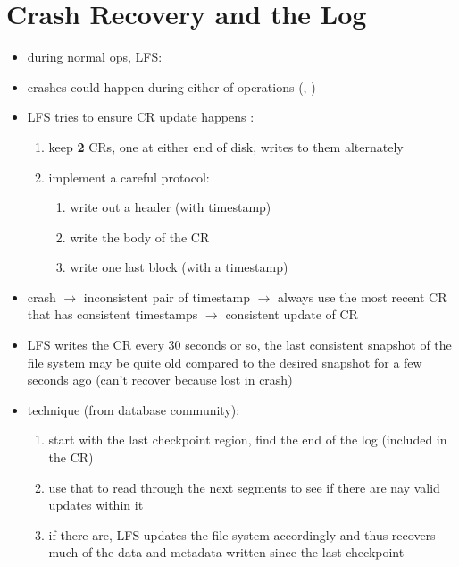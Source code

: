 \section*{Crash Recovery and the Log}
\begin{itemize}
\item during normal ops, LFS:
\item crashes could happen during either of operations (, )
\item LFS tries to ensure CR update happens :
  \begin{enumerate}[label={\alph*.},font={\color{lbl}\bfseries}]
  \item keep \textbf{2} CRs, one at either end of disk, writes to them alternately
  \item implement a careful protocol:
    \begin{enumerate}[leftmargin=1em,label={\arabic*.},font={\color{lbl}\bfseries}]
    \item write out a header (with timestamp)
    \item write the body of the CR
    \item write one last block (with a timestamp)
    \end{enumerate}
  \end{enumerate}
\item crash $\to$ inconsistent pair of timestamp $\to$ always use the most recent CR that has consistent timestamps $\to$ consistent update of CR
\item LFS writes the CR every 30 seconds or so, the last consistent snapshot of the file system may be quite old compared to the desired snapshot for a few seconds ago (can't recover because lost in crash)
\item {} technique (from database community):
  \begin{enumerate}[leftmargin=1em,
    label={\arabic*.},font={\color{lbl}\bfseries}]
  \item start with the last checkpoint region, find the end of the log (included in the CR)
  \item use that to read through the next segments to see if there are nay valid updates within it
  \item if there are, LFS updates the file system accordingly and thus recovers much of the data and metadata written since the last checkpoint
  \end{enumerate}
\end{itemize}
